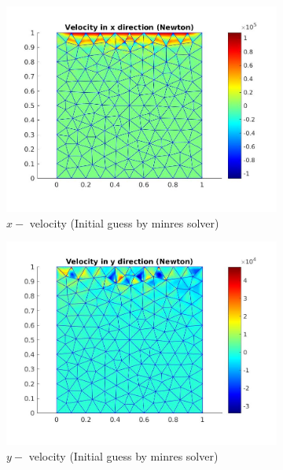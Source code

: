 \documentclass[a4paper]{book}
\begin{document}
\begin{figure}
\begin{subfigure}{0.5\textwidth}	
  \includegraphics[width=\linewidth]{lid_newton_vx_minres.jpg}
  \caption{$x-$ velocity (Initial guess by minres solver)}
  \label{x_vel_navier_stoke_minres_lid}
\end{subfigure}
\begin{subfigure}{0.5\textwidth}	
  \includegraphics[width=\linewidth]{lid_newton_vy_minres.jpg}
  \caption{$y-$ velocity (Initial guess by minres solver)}
  \label{y_vel_navier_stoke_minres_lid}
\end{subfigure}
\begin{subfigure}{\textwidth}	

\end{subfigure}
\end{figure}
\end{document}
